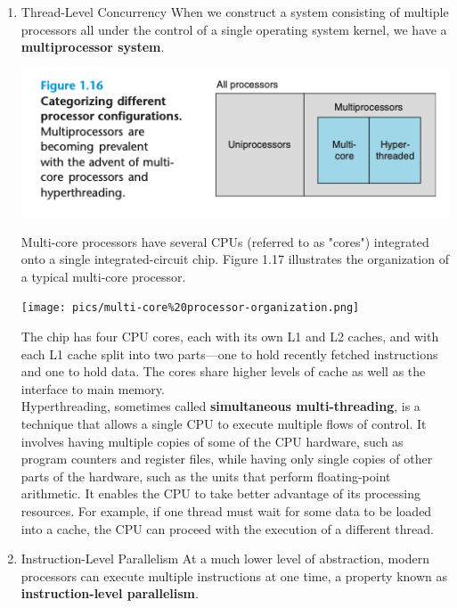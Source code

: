 \documentclass[11pt]{article}
\begin{document}
\begin{enumerate}
\item Thread-Level Concurrency
\label{sec:orgc5e33d4}
When we construct a system consisting of multiple processors all under the control of a single operating system kernel, we have a \textbf{multiprocessor system}.\\

\begin{center}
\includegraphics[width=.9\linewidth]{pics/categorizing-different-processor-configurations.png}
\end{center}

Multi-core processors have several CPUs (referred to as "cores") integrated onto a single integrated-circuit chip. Figure 1.17 illustrates the organization of a typical multi-core processor.\\

\begin{center}
\texttt{[image: pics/multi-core\%20processor-organization.png]}
\end{center}

The chip has four CPU cores, each with its own L1 and L2 caches, and with each L1 cache split into two parts—one to hold recently fetched instructions and one to hold data. The cores share higher levels of cache as well as the interface to main memory.\\

Hyperthreading, sometimes called \textbf{simultaneous multi-threading}, is a technique that allows a single CPU to execute multiple flows of control. It involves having multiple copies of some of the CPU hardware, such as program counters and register files, while having only single copies of other parts of the hardware, such as the units that perform floating-point arithmetic. It enables the CPU to take better advantage of its processing resources. For example, if one thread must wait for some data to be loaded into a cache, the CPU can proceed with the execution of a different thread.\\

\item Instruction-Level Parallelism
\label{sec:org97c5687}
At a much lower level of abstraction, modern processors can execute multiple instructions at one time, a property known as \textbf{instruction-level parallelism}.\\


\end{enumerate}
\end{document}
